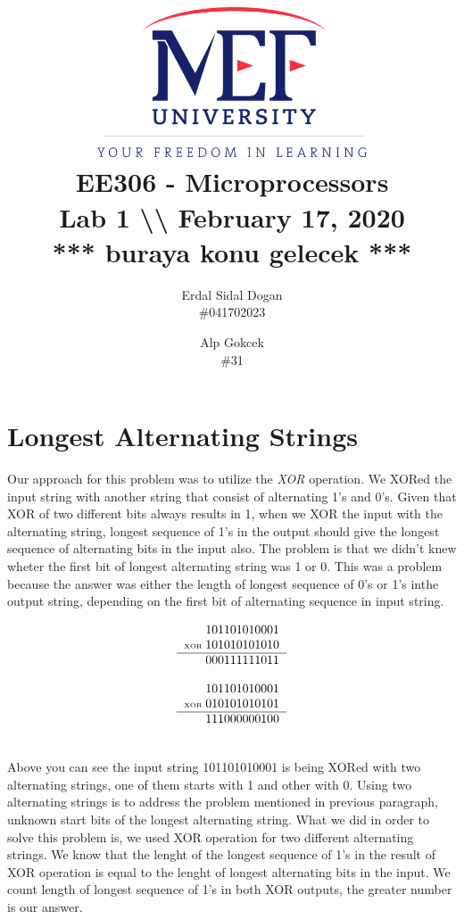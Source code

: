 \documentclass[titlepage]{article}
\date{}
\author{Erdal Sidal Dogan\\ \#041702023  \and Alp
	Gokcek \\ \#31}
\title{\includegraphics[width=0.6\textwidth]{../images/logo_en_color.png}\\ 
\vspace{3em}
EE306 - Microprocessors\\
\vspace{2em}
\textbf{Lab 1 \textbackslash\textbackslash{}
February 17, 2020}\\
*** buraya konu gelecek ***}
\begin{document}
	\maketitle
	\section{Longest Alternating Strings}
	Our approach for this problem was to utilize the \emph{XOR} operation. We XORed the input string with another string that consist of alternating 1's and 0's. Given that XOR of two different bits always results in 1, when we XOR the input  with the alternating string, longest sequence of 1's in the output should give the longest sequence of alternating bits in the input also. The problem is that we didn't knew wheter the first bit of longest alternating string was 1 or 0.  This was a problem because the answer was either the length of longest sequence of 0's or 1's inthe output string, depending on the first bit of alternating sequence in input string.  \\
	
	\begin{minipage}{0.5\textwidth}
		\begin{equation*}
			\begin{tabular}{r@{\;}r}
				& 101101010001  \\
				\tiny{XOR} & 101010101010\\
				\hline
				& 000111111011
			\end{tabular}
		\end{equation*}
	\end{minipage}
	\quad
	\begin{minipage}{0.35\textwidth}
		\begin{equation*}
				\begin{tabular}{r@{\;}r}
				& 101101010001  \\
				\tiny{XOR} & 010101010101\\
				\hline
				& 111000000100
			\end{tabular}
		\end{equation*}
	\end{minipage}
	\\

	Above you can see the input string 101101010001 is being XORed with two alternating strings, one of them starts with 1 and other with 0. Using two alternating strings is to address the problem mentioned in previous paragraph, unknown start bits of the longest alternating string. What we did in order to solve this problem is, we used XOR operation for two different alternating strings. We know that the lenght of the longest sequence of 1's in the result of XOR operation is equal to the lenght of longest alternating bits in the input. We count length of longest sequence of 1's in both XOR outputs, the greater number is our answer.\\
	
\end{document}
